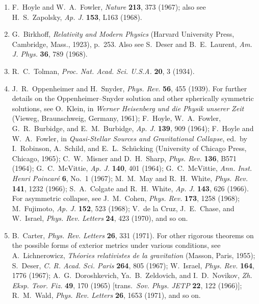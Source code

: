 \begin{enumerate}
  \item {}\label{ch11-ref-29}
  F.~Hoyle and W.~A.~Fowler, \emph{Nature} \textbf{213}, 373 (1967);
  also see H.~S.~Zapolsky, \emph{Ap. J.} \textbf{153}, L163 (1968).

  \item {}\label{ch11-ref-30}
  G.~Birkhoff, \emph{Relativity and Modern Physics} (Harvard University
  Press, Cambridge, Mass., 1923), p.~253. Also see S.~Deser and
  B.~E.~Laurent, \emph{Am. J. Phys.} \textbf{36}, 789 (1968).

  \item {}\label{ch11-ref-31}
  R.~C.~Tolman, \emph{Proc. Nat. Acad. Sci. U.S.A.} \textbf{20}, 3
  (1934).

  \item {}\label{ch11-ref-32}
  J.~R.~Oppenheimer and H.~Snyder, \emph{Phys. Rev.} \textbf{56}, 455
  (1939). For further details on the Oppenheimer--Snyder solution and
  other spherically symmetric solutions, see O.~Klein, in \emph{Werner
  Heisenberg und die Physik unserer Zeit} (Vieweg, Braunschweig, Germany,
  1961); F.~Hoyle, W.~A.~Fowler, G.~R.~Burbidge, and E.~M.~Burbidge,
  \emph{Ap. J.} \textbf{139}, 909 (1964); F.~Hoyle and W.~A.~Fowler, in
  \emph{Quasi-Stellar Sources and Gravitational Collapse}, ed.\ by
  I.~Robinson, A.~Schild, and E.~L.~Sch\"ucking (University of Chicago
  Press, Chicago, 1965); C.~W.~Misner and D.~H.~Sharp, \emph{Phys. Rev.}
  \textbf{136}, B571 (1964); G.~C.~McVittie, \emph{Ap. J.} \textbf{140},
  401 (1964); G.~C.~McVittie, \emph{Ann. Inst. Henri Poincar\'e}
  \textbf{6}, No.~1 (1967); M.~M.~May and R.~H.~White, \emph{Phys. Rev.}
  \textbf{141}, 1232 (1966); S.~A.~Colgate and R.~H.~White,
  \emph{Ap. J.} \textbf{143}, 626 (1966). For asymmetric collapse, see
  J.~M.~Cohen, \emph{Phys. Rev.} \textbf{173}, 1258 (1968);
  M.~Fujimoto, \emph{Ap. J.} \textbf{152}, 523 (1968);
  V.~de la Cruz, J.~E.~Chase, and W.~Israel, \emph{Phys. Rev. Letters}
  \textbf{24}, 423 (1970), and so on.

  \item {}\label{ch11-ref-33}
  B.~Carter, \emph{Phys. Rev. Letters} \textbf{26}, 331 (1971). For other
  rigorous theorems on the possible forms of exterior metrics under various
  conditions, see A.~Lichnerowicz, \emph{Th\'eories relativistes de la
  gravitation} (Masson, Paris, 1955); S.~Deser, \emph{C. R. Acad. Sci.
  Paris} \textbf{264}, 805 (1967); W.~Israel, \emph{Phys. Rev.}
  \textbf{164}, 1776 (1967); A.~G.~Doroshkevich, Ya.~B.~Zeldovich, and
  I.~D.~Novikov, \emph{Zh. Eksp. Teor. Fiz.} \textbf{49}, 170 (1965)
  [trans.\ \emph{Sov. Phys. JETP} \textbf{22}, 122 (1966)];
  R.~M.~Wald, \emph{Phys. Rev. Letters} \textbf{26}, 1653 (1971), and so
  on.


\end{enumerate}
